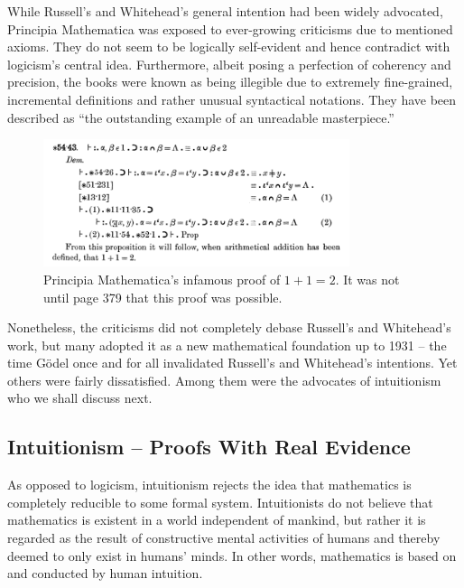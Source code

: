 \documentclass{article}
\begin{document}
While Russell's and Whitehead's general intention had been widely advocated, Principia Mathematica was exposed to ever-growing criticisms due to mentioned axioms. They do not seem to be logically self-evident and hence contradict with logicism's central idea. Furthermore, albeit posing a perfection of coherency and precision, the books were known as being illegible due to extremely fine-grained, incremental definitions and rather unusual syntactical notations. They have been described as ``the outstanding example of an unreadable masterpiece.''\cite[p.~154]{math_experience}

\begin{figure}[h]
	\centering
	\includegraphics[width=0.8\textwidth]{img/principia_mathematica.png}
	\caption{Principia Mathematica's infamous proof of $1+1=2$. It was not until page 379 that this proof was possible.}
\end{figure}
Nonetheless, the criticisms did not completely debase Russell's and Whitehead's work, but many adopted it as a new mathematical foundation up to 1931 -- the time Gödel once and for all invalidated Russell's and Whitehead's intentions. Yet others were fairly dissatisfied. Among them were the advocates of intuitionism who we shall discuss next.

\subsection{Intuitionism -- Proofs With Real Evidence}\label{ssec_intuitionism}
As opposed to logicism, intuitionism rejects the idea that mathematics is completely reducible to some formal system. Intuitionists do not believe that mathematics is existent in a world independent of mankind, but rather it is regarded as the result of constructive mental activities of humans and thereby deemed to only exist in humans' minds. In other words, mathematics is based on and conducted by human intuition.
\end{document}
